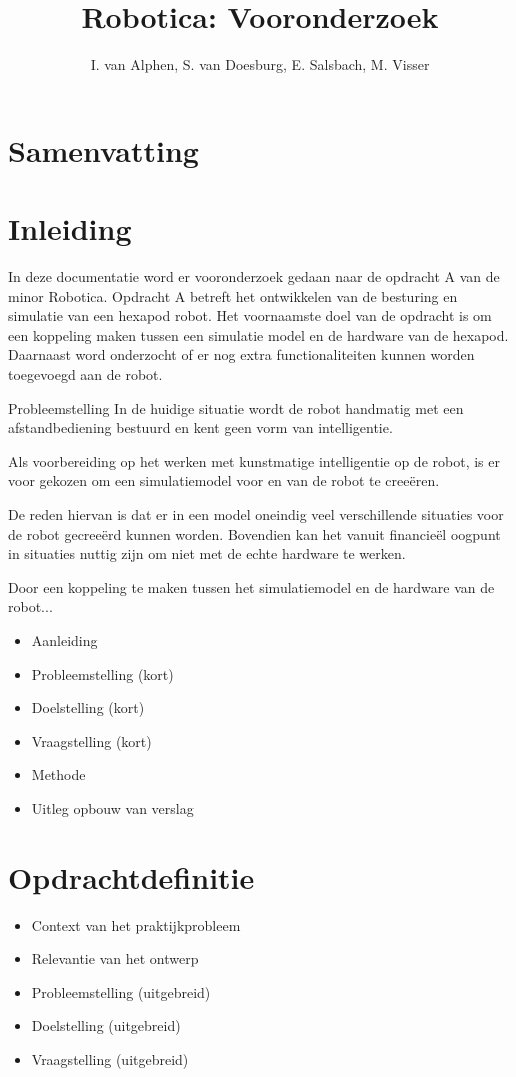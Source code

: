 \documentclass[10pt,a4paper]{article}
\title{Robotica: Vooronderzoek}
\author{I. van Alphen, S. van Doesburg, E.  Salsbach, M. Visser}
\begin{document}
\maketitle

\tableofcontents

\section{Samenvatting}

\newpage

\section{Inleiding}
In deze documentatie word er vooronderzoek gedaan naar de opdracht A van de minor Robotica. Opdracht A betreft het ontwikkelen van de besturing en simulatie van een hexapod robot. Het voornaamste doel van de opdracht is om een koppeling maken tussen een simulatie model en de hardware van de hexapod. Daarnaast word onderzocht of er nog extra functionaliteiten kunnen worden toegevoegd aan de robot.

Probleemstelling
In de huidige situatie wordt de robot handmatig met een afstandbediening bestuurd en kent geen vorm van intelligentie. 

Als voorbereiding op het werken met kunstmatige intelligentie op de robot, is er voor gekozen om een simulatiemodel voor en van de robot te cree\"eren. 

De reden hiervan is dat er in een model oneindig veel verschillende situaties voor de robot gecree\"erd kunnen worden. Bovendien kan het vanuit financie\"el oogpunt in situaties nuttig zijn om niet met de echte hardware te werken. 

Door een koppeling te maken tussen het simulatiemodel en de hardware van de robot...

\begin{itemize}
\setlength\itemsep{0em}
\item Aanleiding 
\item Probleemstelling (kort) 
\item Doelstelling (kort) 
\item Vraagstelling (kort) 
\item Methode 
\item Uitleg opbouw van verslag
\end{itemize}

\section{Opdrachtdefinitie}
\begin{itemize}
\setlength\itemsep{0em}
\item Context van het praktijkprobleem 
\item Relevantie van het ontwerp
\item Probleemstelling (uitgebreid) 
\item Doelstelling (uitgebreid) 
\item Vraagstelling (uitgebreid)
\end{itemize}
\end{document}
